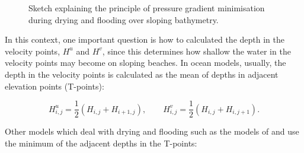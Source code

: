 \setlength{\unitlength}{0.5cm}
\begin{figure}
\begin{center}
\caption{
Sketch explaining the principle of pressure gradient
minimisation during drying and flooding over sloping bathymetry.
}
\label{figpressgrad}
\end{center}
\end{figure}

In this context, one important question is how to calculated the depth 
in the velocity points, $H^u$ and $H^v$, since this determines how shallow the
water in the velocity points may become on sloping beaches. 
In ocean models, usually, the depth in the velocity points is calculated as
the mean of depths in adjacent elevation points (T-points):

\begin{equation}\label{Hmean}
H^u_{i,j}=\frac12\left(H_{i,j}+H_{i+1,j}\right),
\qquad
H^v_{i,j}=\frac12\left(H_{i,j}+H_{i,j+1}\right).
\end{equation}

Other models which deal with drying and flooding such as the models of
\cite{DUWE88} and \cite{CASULLIea94} use the minimum of the adjacent depths in
the T-points:

